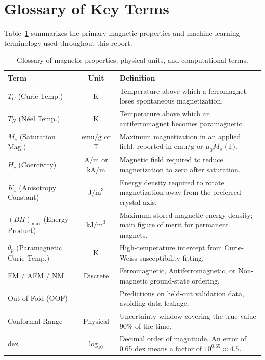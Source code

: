 \documentclass[11pt,a4paper]{article}
\begin{document}
\clearpage
\section*{Glossary of Key Terms}

Table~\ref{tab:glossary} summarizes the primary magnetic properties and machine learning terminology used throughout this report.

\begin{table}[H]
\centering
\small\sffamily
\caption{Glossary of magnetic properties, physical units, and computational terms.}
\label{tab:glossary}
\begin{tabularx}{\textwidth}{l c X}
\toprule
\textbf{\color{navyblue}Term} & \textbf{\color{navyblue}Unit} & \textbf{\color{navyblue}Definition} \\
\midrule
$T_C$ (Curie Temp.) & $\text{K}$ & Temperature above which a ferromagnet loses spontaneous magnetization. \\
$T_N$ (Néel Temp.) & $\text{K}$ & Temperature above which an antiferromagnet becomes paramagnetic. \\
$M_s$ (Saturation Mag.) & $\text{emu/g}$ or $\text{T}$ & Maximum magnetization in an applied field, reported in $\text{emu/g}$ or $\mu_0 M_s$ ($\text{T}$). \\
$H_c$ (Coercivity) & $\text{A/m}$ or $\text{kA/m}$ & Magnetic field required to reduce magnetization to zero after saturation. \\
$K_1$ (Anisotropy Constant) & $\text{J/m}^3$ & Energy density required to rotate magnetization away from the preferred crystal axis. \\
$(BH)_{\max}$ (Energy Product) & $\text{kJ/m}^3$ & Maximum stored magnetic energy density; main figure of merit for permanent magnets. \\
$\theta_p$ (Paramagnetic Curie Temp.) & $\text{K}$ & High-temperature intercept from Curie-Weiss susceptibility fitting. \\
FM / AFM / NM & Discrete & Ferromagnetic, Antiferromagnetic, or Non-magnetic ground-state ordering. \\
\midrule
Out-of-Fold (OOF) & -- & Predictions on held-out validation data, avoiding data leakage. \\
Conformal Range & Physical & Uncertainty window covering the true value 90\% of the time. \\
dex & $\log_{10}$ & Decimal order of magnitude. An error of 0.65 dex means a factor of $10^{0.65} \approx 4.5$. \\
\bottomrule
\end{tabularx}
\end{table}
\end{document}
